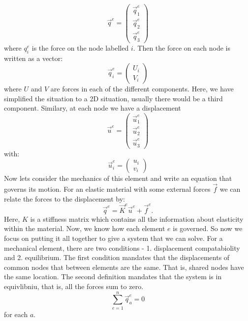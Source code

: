 \documentclass{article}
\begin{document}
\begin{equation}
	\vec{q}^{e} = \begin{pmatrix}
		\vec{q}^{e}_{1} \\
		\vec{q}^{e}_{2} \\
		\vec{q}^{e}_{3}
	\end{pmatrix}
\end{equation}
where $q^{e}_{i}$ is the force on the node labelled $i$. Then the force on each node is written as a vector:
\begin{equation}
	\vec{q}^{e}_{i} = \begin{pmatrix}
		U_i \\ 
		V_i 
	\end{pmatrix}
\end{equation}
where $U$ and $V$ are forces in each of the different components. Here, we have simplified the situation to a 2D situation, usually there would be a third component.
\newline
Similary, at each node we have a displacement 
\begin{equation}
	\vec{u}^{e} = \begin{pmatrix}
		\vec{u}^{e}_{1} \\ 
		\vec{u}^{e}_{2} \\
		\vec{u}^{e}_{3} 
	\end{pmatrix}
\end{equation}
with:
\begin{equation}
	\vec{u}^{e}_{i} = \begin{pmatrix}
		u_i \\ 
		v_i
	\end{pmatrix}
\end{equation}
\newline
Now lets consider the mechanics of this element and write an equation that governs its motion. For an elastic material with some external forces $\vec{f}$ we can relate the forces to the displacement by:
\begin{equation}
	\vec{q}^{e} = \vec{K}^{e} \vec{u}^{e} + \vec{f}^{e}.
\end{equation}
Here, $K$ is a stiffness matrix which contains all the information about elasticity within the material.
\newline
Now, we know how each element $e$ is governed. So now we focus on putting it all together to give a system that we can solve.
\newline
For a mechanical element, there are two conditions - 1. displacement compatabiolity and 2. equilibrium. The first condition mandates that the displacements of common nodes that between elements are the same. That is, shared nodes have the same location. The second definition mandates that the system is in equivlibniu\m, that is, all the forces sum to zero.
\newline
\begin{equation}
	\sum_{e=1}^{n} \vec{q}^{e}_{a} = 0
\end{equation}
for each $a$. 
\newline
\end{document}
